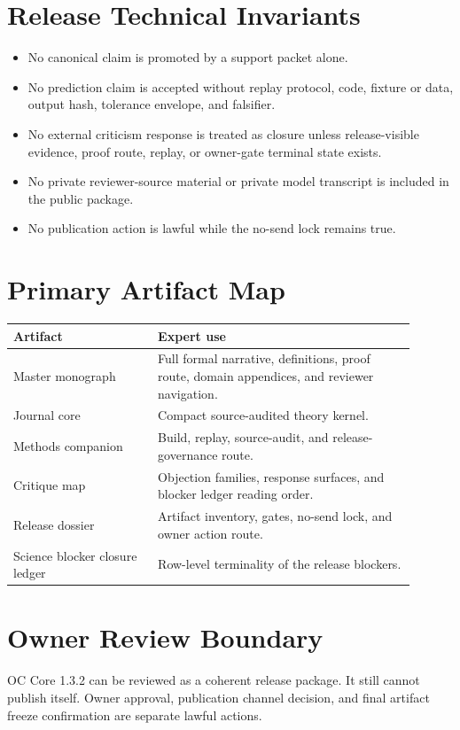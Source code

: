 \documentclass[11pt,a4paper]{article}
\begin{document}
\section*{Release Technical Invariants}
\begin{itemize}
  \item No canonical claim is promoted by a support packet alone.
  \item No prediction claim is accepted without replay protocol, code, fixture or data, output hash, tolerance envelope, and falsifier.
  \item No external criticism response is treated as closure unless release-visible evidence, proof route, replay, or owner-gate terminal state exists.
  \item No private reviewer-source material or private model transcript is included in the public package.
  \item No publication action is lawful while the no-send lock remains true.
\end{itemize}

\section*{Primary Artifact Map}
\begin{longtable}{>{\raggedright\arraybackslash}p{0.32\linewidth}>{\raggedright\arraybackslash}p{0.58\linewidth}}
\textbf{Artifact} & \textbf{Expert use}\\
\hline
Master monograph & Full formal narrative, definitions, proof route, domain appendices, and reviewer navigation.\\
Journal core & Compact source-audited theory kernel.\\
Methods companion & Build, replay, source-audit, and release-governance route.\\
Critique map & Objection families, response surfaces, and blocker ledger reading order.\\
Release dossier & Artifact inventory, gates, no-send lock, and owner action route.\\
Science blocker closure ledger & Row-level terminality of the release blockers.\\
\end{longtable}

\section*{Owner Review Boundary}
OC Core 1.3.2 can be reviewed as a coherent release package. It still cannot publish itself. Owner approval, publication channel decision, and final artifact freeze confirmation are separate lawful actions.
\end{document}
